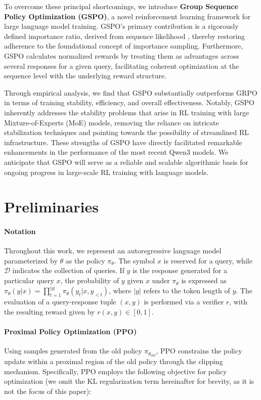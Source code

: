 To overcome these principal shortcomings, we introduce \textbf{Group Sequence Policy Optimization (GSPO)}, a novel reinforcement learning framework for large language model training. GSPO’s primary contribution is a rigorously defined importance ratio, derived from sequence likelihood \citep{click}, thereby restoring adherence to the foundational concept of importance sampling. Furthermore, GSPO calculates normalized rewards by treating them as advantages across several responses for a given query, facilitating coherent optimization at the sequence level with the underlying reward structure.

Through empirical analysis, we find that GSPO substantially outperforms GRPO in terms of training stability, efficiency, and overall effectiveness. Notably, GSPO inherently addresses the stability problems that arise in RL training with large Mixture-of-Experts (MoE) models, removing the reliance on intricate stabilization techniques and pointing towards the possibility of streamlined RL infrastructure. These strengths of GSPO have directly facilitated remarkable enhancements in the performance of the most recent Qwen3 models. We anticipate that GSPO will serve as a reliable and scalable algorithmic basis for ongoing progress in large-scale RL training with language models.

\section{Preliminaries}

\paragraph{Notation}
Throughout this work, we represent an autoregressive language model parameterized by $\theta$ as the policy $\pi_\theta$. The symbol $x$ is reserved for a query, while $\mathcal{D}$ indicates the collection of queries. If $y$ is the response generated for a particular query $x$, the probability of $y$ given $x$ under $\pi_\theta$ is expressed as $\pi_\theta (y | x)=\prod_{t=1}^{|y|} \pi_\theta (y_t | x, y_{<t} )$, where $|y|$ refers to the token length of $y$. The evaluation of a query-response tuple $(x, y)$ is performed via a verifier $r$, with the resulting reward given by $r(x, y) \in [0, 1]$.

\paragraph{Proximal Policy Optimization (PPO)} Using samples generated from the old policy $\pi_{\theta_\text{old}}$, PPO \citep{ppo} constrains the policy update within a proximal region of the old policy through the clipping mechanism. Specifically, PPO employs the following objective for policy optimization (we omit the KL regularization term hereinafter for brevity, as it is not the focus of this paper):

